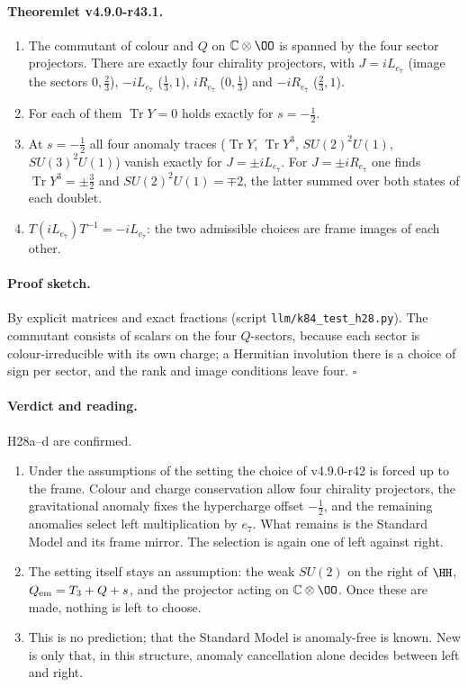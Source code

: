 \paragraph{Theoremlet v4.9.0-r43.1.}
\begin{enumerate}[leftmargin=2em]
\item[(a)] The commutant of colour and \(Q\) on \(\mathbb C\otimes\OO\) is spanned by the four sector projectors.  There are exactly four chirality
projectors, with \(J=iL_{e_7}\) (image the sectors \(0,\tfrac23\)), \(-iL_{e_7}\) (\(\tfrac13,1\)), \(iR_{e_7}\) (\(0,\tfrac13\)) and \(-iR_{e_7}\)
(\(\tfrac23,1\)).
\item[(b)] For each of them \(\operatorname{Tr}Y=0\) holds exactly for \(s=-\tfrac12\).
\item[(c)] At \(s=-\tfrac12\) all four anomaly traces (\(\operatorname{Tr}Y\), \(\operatorname{Tr}Y^3\), \(SU(2)^2U(1)\), \(SU(3)^2U(1)\)) vanish
exactly for \(J=\pm iL_{e_7}\).  For \(J=\pm iR_{e_7}\) one finds \(\operatorname{Tr}Y^3=\pm\tfrac32\) and \(SU(2)^2U(1)=\mp2\), the latter
summed over both states of each doublet.
\item[(d)] \(T(iL_{e_7})T^{-1}=-iL_{e_7}\): the two admissible choices are frame images of each other.
\end{enumerate}

\paragraph{Proof sketch.}
By explicit matrices and exact fractions (script \texttt{llm/k84\_test\_h28.py}).  The commutant consists of scalars on the four \(Q\)-sectors,
because each sector is colour-irreducible with its own charge; a Hermitian involution there is a choice of sign per sector, and the rank and
image conditions leave four.  \(\square\)

\paragraph{Verdict and reading.}
H28a--d are confirmed.
\begin{enumerate}[leftmargin=2em]
\item Under the assumptions of the setting the choice of v4.9.0-r42 is forced up to the frame.  Colour and charge conservation allow
four chirality projectors, the gravitational anomaly fixes the hypercharge offset \(-\tfrac12\), and the remaining anomalies select left
multiplication by \(e_7\).  What remains is the Standard Model and its frame mirror.  The selection is again one of left against right.
\item The setting itself stays an assumption: the weak \(SU(2)\) on the right of \(\HH\), \(Q_{\rm em}=T_3+Q+s\), and the projector acting on
\(\mathbb C\otimes\OO\).  Once these are made, nothing is left to choose.
\item This is no prediction; that the Standard Model is anomaly-free is known.  New is only that, in this structure, anomaly cancellation
alone decides between left and right.
\end{enumerate}

